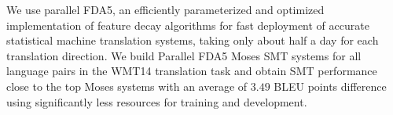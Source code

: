 We use parallel FDA5, an efficiently parameterized and optimized implementation of feature decay algorithms for fast deployment of accurate statistical machine translation systems, taking only about half a day for each translation direction. We build Parallel FDA5 Moses SMT systems for all language pairs in the WMT14 translation task and obtain SMT performance close to the top Moses systems with an average of $3.49$ BLEU points difference using significantly less resources for training and development.
